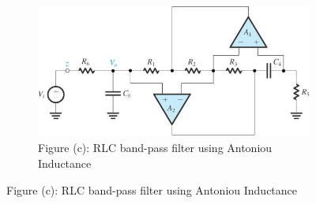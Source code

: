 \documentclass{article}
\begin{document}
\begin{CJK*}{UTF8}{bkai}
\begin{figure}[h]
    \begin{center}
        \begin{subfigure}[b]{0.6\textwidth}
            \includegraphics[width=\textwidth]{BP_Antoniou_Inductance.png}
            \caption*{Figure (c): RLC band-pass filter using Antoniou Inductance}
        \end{subfigure}
    \end{center}
\end{figure}


\end{CJK*}
\end{document}
